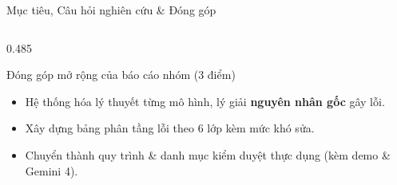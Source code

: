 \documentclass[aspectratio=169,10pt]{beamer}
\begin{document}
\begin{frame}{Mục tiêu, Câu hỏi nghiên cứu \& Đóng góp}
\begin{columns}[T,totalwidth=\textwidth]
\begin{column}{0.485\textwidth}
    \begin{hboxcard}[height=2.60cm,top=3pt,bottom=3pt]{Đóng góp mở rộng của báo cáo nhóm (3 điểm)}
      \begin{itemize}\scriptsize\setlength{\itemsep}{1.8pt}
        \item Hệ thống hóa lý thuyết từng mô hình, lý giải \textbf{nguyên nhân gốc} gây lỗi.
        \item Xây dựng bảng phân tầng lỗi theo 6 lớp kèm mức khó sửa.
        \item Chuyển thành quy trình \& danh mục kiểm duyệt thực dụng (kèm demo \& Gemini 4).
      \end{itemize}
    \end{hboxcard}
  \end{column}
\end{columns}
\end{frame}
\end{document}
